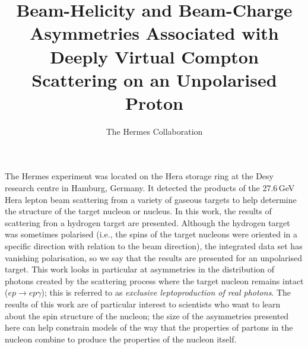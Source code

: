 \documentclass[11pt]{article}
\begin{document}
\title{Beam-Helicity and Beam-Charge Asymmetries Associated with Deeply Virtual Compton Scattering on an Unpolarised Proton}
\author{The {\sc Hermes } Collaboration}

\maketitle

The H{\sc ermes} experiment was located on the H{\sc era} storage ring at the D{\sc esy} research centre in Hamburg, Germany. It detected the products of the 27.6\,GeV H{\sc era} lepton beam scattering from a variety of gaseous targets to help determine the structure of the target nucleon or nucleus. In this work, the results of scattering fron a hydrogen target are presented. Although the hydrogen target was sometimes polarised (i.e., the spins of the target nucleons were oriented in a specific direction with relation to the beam direction), the integrated data set has vanishing polarisation, so we say that the results are presented for an unpolarised target. This work looks in particular at asymmetries in the distribution of photons created by the scattering process where the target nucleon remains intact ($ep\rightarrow ep\gamma$); this is referred to as \emph{exclusive leptoproduction of real photons}. The results of this work are of particular interest to scientists who want to learn about the spin structure of the nucleon; the size of the asymmetries presented here can help constrain models of the way that the properties of partons in the nucleon combine to produce the properties of the nucleon itself.
\end{document}
